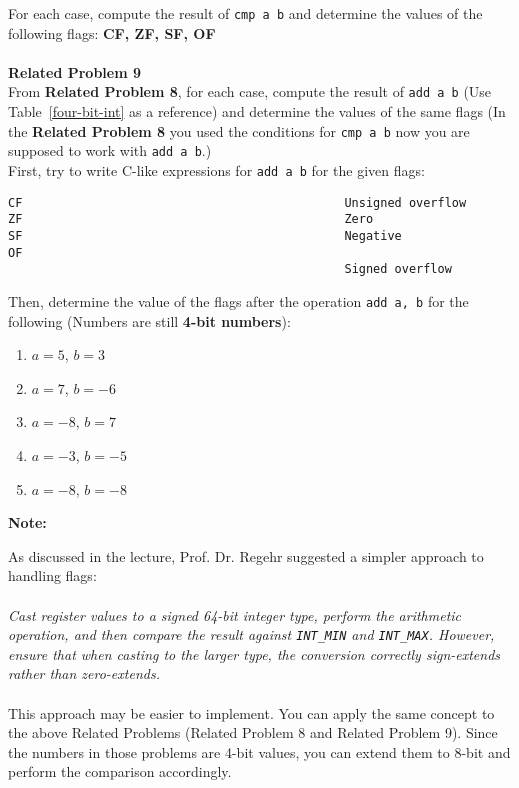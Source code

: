 For each case, compute the result of \texttt{cmp a b} and determine 
the values of the following flags: \textbf{CF, ZF, SF, OF} \\
\\
%
\clearpage
%
\noindent\textbf{Related Problem 9}  \\
%
From \textbf{Related Problem 8}, for each case, compute the result of 
\texttt{add a b} (Use Table~\ref{four-bit-int} as a reference) and determine 
the values of the same flags (In the \textbf{Related Problem 8} you used the 
conditions for \texttt{cmp a b} now you are supposed to work with \texttt{add a b}.) \\ 
First, try to write C-like expressions for \texttt{add a b} for the given flags: \\
%
\begin{Verbatim}[frame=single]
CF                                             Unsigned overflow
ZF                                             Zero
SF                                             Negative
OF   
                                               Signed overflow
\end{Verbatim}

Then, determine the value of the flags after the operation \texttt{add a, b} 
for the following (Numbers are still \textbf{4-bit numbers}): \\
\begin{enumerate}
    \item $a = 5$, $b = 3$
    \item $a = 7$, $b = -6$
    \item $a = -8$, $b = 7$
    \item $a = -3$, $b = -5$
    \item $a = -8$, $b = -8$
\end{enumerate}

\noindent\textbf{Note:}  

As discussed in the lecture, Prof. Dr. Regehr suggested a simpler approach to handling flags: \\
\\
\textit{Cast register values to a signed 64-bit integer type, perform the arithmetic 
operation, and then compare the result against \texttt{INT\_MIN} and \texttt{INT\_MAX}. 
However, ensure that when casting to the larger type, the conversion correctly 
sign-extends rather than zero-extends.} \\
\\
This approach may be easier to implement. You can apply the same concept to the 
above Related Problems (Related Problem 8 and Related Problem 9). Since the numbers 
in those problems are 4-bit values, you can extend them to 8-bit and perform the 
comparison accordingly.
%
\clearpage
%

